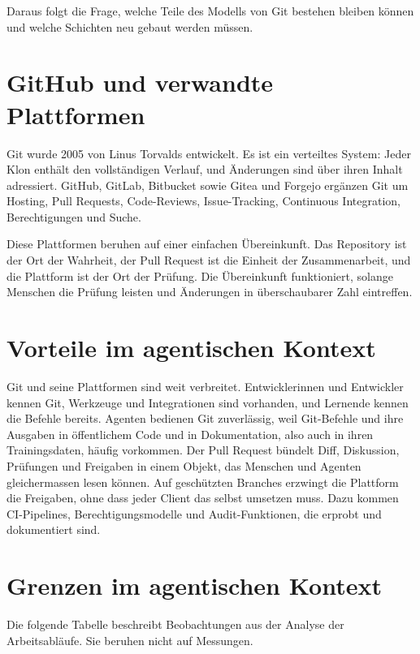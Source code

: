Daraus folgt die Frage, welche Teile des Modells von Git bestehen bleiben können
und welche Schichten neu gebaut werden müssen.

\section{GitHub und verwandte Plattformen}

Git wurde 2005 von Linus Torvalds entwickelt. Es ist ein verteiltes System:
Jeder Klon enthält den vollständigen Verlauf, und Änderungen sind über ihren Inhalt adressiert.
GitHub, GitLab, Bitbucket sowie Gitea und Forgejo ergänzen Git um Hosting, Pull Requests,
Code-Reviews, Issue-Tracking, Continuous Integration, Berechtigungen und Suche.

Diese Plattformen beruhen auf einer einfachen Übereinkunft.
Das Repository ist der Ort der Wahrheit, der Pull Request ist die Einheit der Zusammenarbeit,
und die Plattform ist der Ort der Prüfung. Die Übereinkunft funktioniert,
solange Menschen die Prüfung leisten und Änderungen in überschaubarer Zahl eintreffen.

\section{Vorteile im agentischen Kontext}

Git und seine Plattformen sind weit verbreitet.
Entwicklerinnen und Entwickler kennen Git, Werkzeuge und Integrationen sind vorhanden,
und Lernende kennen die Befehle bereits.
Agenten bedienen Git zuverlässig, weil Git-Befehle und ihre Ausgaben
in öffentlichem Code und in Dokumentation, also auch in ihren Trainingsdaten, häufig vorkommen.
Der Pull Request bündelt Diff, Diskussion, Prüfungen und Freigaben in einem Objekt,
das Menschen und Agenten gleichermassen lesen können.
Auf geschützten Branches erzwingt die Plattform die Freigaben,
ohne dass jeder Client das selbst umsetzen muss.
Dazu kommen CI-Pipelines, Berechtigungsmodelle und Audit-Funktionen,
die erprobt und dokumentiert sind.

\section{Grenzen im agentischen Kontext}

Die folgende Tabelle beschreibt Beobachtungen aus der Analyse der Arbeitsabläufe.
Sie beruhen nicht auf Messungen.


